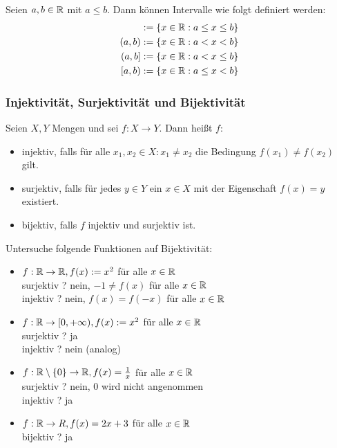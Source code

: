 \begin{bem}[Intervalle]
	Seien $ a,b \in \mathbb R $ mit $ a \leq b $. Dann können Intervalle wie folgt definiert werden:
	\begin{align*}
		[a,b] &:= \{ x \in \R : a \leq x \leq b \}\\
		(a,b) &:= \{ x \in \R : a < x < b \}\\
		(a,b] &:= \{ x \in \R : a < x \leq b \}\\
		[a,b) &:= \{ x \in \R : a \leq x < b \}
	\end{align*}
\end{bem}

\subsubsection{Injektivität, Surjektivität und Bijektivität}

Seien $ X,Y $ Mengen und sei $ f : X \to Y $. Dann heißt $ f $:
\begin{itemize}
	\item injektiv, falls für alle $ x_1, x_2 \in X : x_1 \neq x_2 $ die Bedingung $ f(x_1) \neq f(x_2) $ gilt.
	\item surjektiv, falls für jedes $ y \in Y $ ein $ x \in X $ mit der Eigenschaft $ f(x) = y $ existiert.
	\item bijektiv, falls $ f $ injektiv und surjektiv ist.
\end{itemize}

\begin{bsp}
	Untersuche folgende Funktionen auf Bijektivität:
	\begin{itemize}
		\item $ f : \mathbb R \to \mathbb R, f(x) := x^2 $ für alle $ x \in \mathbb R $\\
		surjektiv ? nein, $ -1 \neq f(x) $ für alle $ x \in \mathbb R $\\
		injektiv ? nein, $ f(x) = f(-x) $ für alle $ x \in \mathbb R $
		\item $ f : \mathbb R \to [0,+\infty), f(x) := x^2 $ für alle $ x \in \mathbb R $\\
		surjektiv ? ja\\
		injektiv ? nein (analog)
		\item $ f : \mathbb R \setminus \{ 0 \} \to \mathbb R, f(x) = \frac{1}{x} $ für alle $ x \in \mathbb R $\\
		surjektiv ? nein, 0 wird nicht angenommen\\
		injektiv ? ja
		\item $ f : \mathbb R \to R, f(x) = 2x + 3 $ für alle $ x \in \mathbb R $\\
		bijektiv ? ja
	\end{itemize}
\end{bsp}

